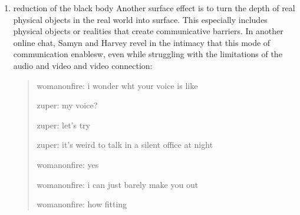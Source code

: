 \documentclass[11pt]{article}
\begin{document}
\begin{enumerate}

Because this code is unreadable to the human eye, it requires specific
authoring software to work with it. A "Flash Decompiler" program, for
this purpose, offers an interface for seeing the components of a Flash
file without having to work with the machine code layer. In the below
image of one such program, the file is separated into individual
components like "sounds," "frames," and "scripts," visible on the left
sidebar. The interface here abstracts the machine code so that humans
can make sense of it. For example, one can make changes to the
animation, such as distort the sound of the heartbeat which is
contained within the "frames" component.

[IMAGE OF FLASH DECOMPILER INTERFACE ON "HEARTBEAT.SWF"]

The Flash elements throughout this work, which appear on many of its
pages, illustrate the displacement inherent to electronic media. In
order to work with Flash media, abstraction is necessary. Objects on
the screen are separated into components, into shapes, sounds, and
movements. But these components themselves are surface
effects. Immediately beneath them is a bytestream, a torrent of
symbols and characeters that cannot be read with human eyes. The
object can be rendered in with the decompiler is only another kind of
surface effect. This is an example of total foreclosure of formal
materiality of the technological stack, a kind of foreclosure that
points to physicality of the surface.

\item reduction of the black body
\label{sec:orgd8bc869}
Another surface effect is to turn the depth of real physical objects
in the real world into surface. This especially includes physical
objects or realities that create communicative barriers. In another
online chat, Samyn and Harvey revel in the intimacy that this mode of
communication enablesw, even while struggling with the limitations of
the audio and video and video connection:
\begin{quote}
womanonfire: i wonder wht your voice is like

zuper: my voice?

zuper: let's try

zuper: it's weird to talk in a silent office at night

womanonfire: yes

womanonfire: i can just barely make you out

womanonfire: how fitting


\end{quote}
\end{enumerate}
\end{document}
